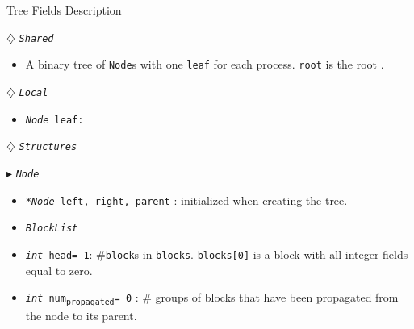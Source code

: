\documentclass[10pt]{article}
\newcommand{\sub}[1]{\textsubscript{#1}}
\renewcommand{\tt}[1]{\texttt{#1}}
\renewcommand{\sl}[1]{\textsl{#1}}
\renewcommand{\bf}[1]{\textbf{#1}}
\newcommand{\nf}[1]{{\normalfont{\texttt{#1}}}}
\newcommand{\head}{head}
\theoremstyle{definition}
\begin{document}
\begin{algorithm}
\caption{Tree Fields Description}
\begin{algorithmic}[1]
\setcounter{ALG@line}{100}
\begin{multicols}{2}


\Statex $\diamondsuit$ \tt{\sl{Shared}}
\begin{itemize}
\item \textsf{A binary tree of \tt{Node}s with one \tt{leaf} for each process. \tt{root} is the root \nf{node}.}
\end{itemize}

\Statex

\Statex $\diamondsuit$ \tt{\sl{Local}}
\begin{itemize}
\item \tt{\sl{Node} leaf:} 
\end{itemize}

\Statex
\Statex $\diamondsuit$ \tt{\sl{Structures}}

\Statex $\blacktriangleright$ \tt{\sl{Node}}
\begin{itemize}
\item \tt{\sl{*Node} left, right, parent} \textsf{: initialized  when creating the tree.}
\item \tt{\sl{BlockList}}
\item \tt{\sl{int} \head= 1}\textsf{: \#\tt{block}s in \tt{blocks}. \tt{blocks[0]} is a block with all integer fields equal to zero.}
\item \tt{\sl{int} num\sub{propagated}= 0}\textsf{} \textsf{: \# groups of blocks that have been propagated from the node to its parent.}
\end{itemize}

%  
%
%  

    


\end{multicols}
\end{algorithmic}
\end{algorithm}
\end{document}
